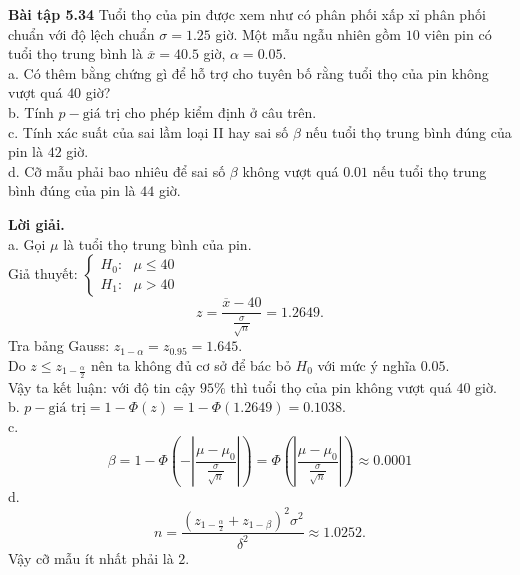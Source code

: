 \begin{mybox}
\textbf{Bài tập 5.34} Tuổi thọ của pin được xem như có phân phối xấp xỉ phân phối chuẩn với độ lệch chuẩn $\sigma = 1.25$ giờ. Một mẫu ngẫu nhiên gồm $10$ viên pin có tuổi thọ trung bình là $\overline{x} = 40.5$ giờ, $\alpha = 0.05.$\\
a. Có thêm bằng chứng gì để hỗ trợ cho tuyên bố rằng tuổi thọ của pin không vượt quá $40$ giờ?\\
b. Tính $p-\text{giá trị}$ cho phép kiểm định ở câu trên.\\
c. Tính xác suất của sai lầm loại II hay sai số $\beta$ nếu tuổi thọ trung bình đúng của pin là $42$ giờ.\\
d. Cỡ mẫu phải bao nhiêu để sai số $\beta$ không vượt quá $0.01$ nếu tuổi thọ trung bình đúng của pin là $44$ giờ.
\end{mybox}
\textbf{Lời giải.}\\
a. Gọi $\mu$ là tuổi thọ trung bình của pin.\\ 
Giả thuyết: $\begin{cases}
H_0: \text{ } \mu \leqslant 40\\
H_1: \text{ } \mu > 40
\end{cases} $ \\
$$z = \frac{\overline{x} - 40}{\frac{\sigma}{\sqrt{n}}} = 1.2649.$$
Tra bảng Gauss: $z_{1 - \alpha} = z_{0.95} = 1.645.$\\
Do $z \leqslant z_{1 - \frac{\alpha}{2}}$ nên ta không đủ cơ sở để bác bỏ $H_0$ với mức ý nghĩa $0.05.$\\
Vậy ta kết luận: với độ tin cậy $95\%$ thì tuổi thọ của pin không vượt quá $40$ giờ.\\
b. $p-\text{giá trị} = 1 - \Phi \left( z \right) = 1 - \Phi \left( {1.2649} \right) = 0.1038.$\\
c. $$\beta  = 1 - \Phi \left( { - \left| {\frac{{\mu  - {\mu _0}}}{{\frac{\sigma }{{\sqrt n }}}}} \right|} \right) = \Phi \left( {\left| {\frac{{\mu  - {\mu _0}}}{{\frac{\sigma }{{\sqrt n }}}}} \right|} \right) \approx 0.0001$$
d. $$n = \frac{{{{\left( {{z_{1 - \frac{\alpha }{2}}} + {z_{1 - \beta }}} \right)}^2}{\sigma ^2}}}{{{\delta ^2}}} \approx 1.0252.$$
Vậy cỡ mẫu ít nhất phải là $2.$

